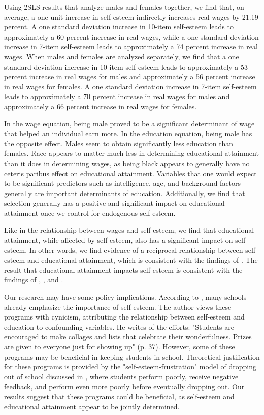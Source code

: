 \documentclass[12pt]{report}
\newcommand{\citee}[1]{\citename{#1} \citeyear{#1}}
\begin{document}
Using 2SLS results that analyze males and females together, we find that, on average, a one unit increase in self-esteem indirectly increases real wages by 21.19 percent. A one standard deviation increase in 10-item self-esteem leads to approximately a 60 percent increase in real wages, while a one standard deviation increase in 7-item self-esteem leads to approximately a 74 percent increase in real wages. When males and females are analyzed separately, we find that a one standard deviation increase in 10-item self-esteem leads to approximately a 53 percent increase in real wages for males and approximately a 56 percent increase in real wages for females. A one standard deviation increase in 7-item self-esteem leads to approximately a 70 percent increase in real wages for males and approximately a 66 percent increase in real wages for females.

In the wage equation, being male proved to be a significant determinant of wage that helped an individual earn more. In the education equation, being male has the opposite effect. Males seem to obtain significantly less education than females. Race appears to matter much less in determining educational attainment than it does in determining wages, as being black appears to generally have no ceteris paribus effect on educational attainment. Variables that one would expect to be significant predictors such as intelligence, age, and background factors generally are important determinants of education. Additionally, we find that selection generally has a positive and significant impact on educational attainment once we control for endogenous self-esteem.

Like in the relationship between wages and self-esteem, we find that educational attainment, while affected by self-esteem, also has a significant impact on self-esteem. In other words, we find evidence of a reciprocal relationship between self-esteem and educational attainment, which is consistent with the findings of \citee{LKR1992}. The result that educational attainment impacts self-esteem is consistent with the findings of  \citee{RSS1989}, \citee{F1998}, and \citee{RB2000}.

Our research may have some policy implications. According to \citee{B2005}, many schools already emphasize the importance of self-esteem. The author views these programs with cynicism, attributing the relationship between self-esteem and education to confounding variables. He writes of the efforts: "Students are encouraged to make collages and lists that celebrate their wonderfulness. Prizes are given to everyone just for showing up" (p. 37). However, some of these programs may be beneficial in keeping students in school. Theoretical justification for these programs is provided by the "self-esteem-frustration" model of dropping out of school discussed in \citee{F1989}, where students perform poorly, receive negative feedback, and perform even more poorly before eventually dropping out. Our results suggest that these programs could be beneficial, as self-esteem and educational attainment appear to be jointly determined.
\end{document}
